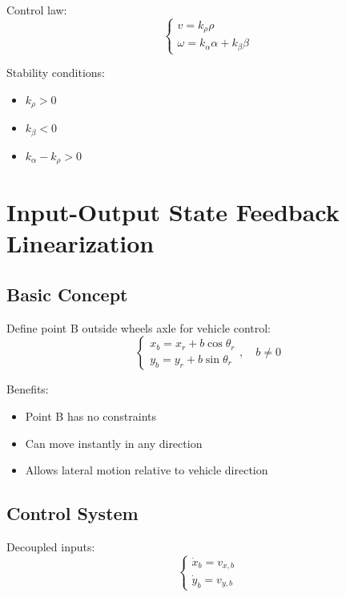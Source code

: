 \documentclass[openany]{book}
\theoremstyle{definition}
\theoremstyle{remark}
\begin{document}
Control law:
\begin{equation}
    \begin{cases}
        v = k_\rho\rho \\
        \omega = k_\alpha\alpha + k_\beta\beta
    \end{cases}
\end{equation}

Stability conditions:
\begin{itemize}
    \item $k_\rho > 0$
    \item $k_\beta < 0$
    \item $k_\alpha - k_\rho > 0$
\end{itemize}

\section{Input-Output State Feedback Linearization}

\subsection{Basic Concept}
Define point B outside wheels axle for vehicle control:
\begin{equation}
    \begin{cases}
        x_b = x_r + b\cos\theta_r \\
        y_b = y_r + b\sin\theta_r
    \end{cases}, \quad b \neq 0
\end{equation}

Benefits:
\begin{itemize}
    \item Point B has no constraints
    \item Can move instantly in any direction
    \item Allows lateral motion relative to vehicle direction
\end{itemize}

\subsection{Control System}
Decoupled inputs:
\begin{equation}
    \begin{cases}
        \dot{x}_b = v_{x,b} \\
        \dot{y}_b = v_{y,b}
    \end{cases}
\end{equation}
\end{document}
